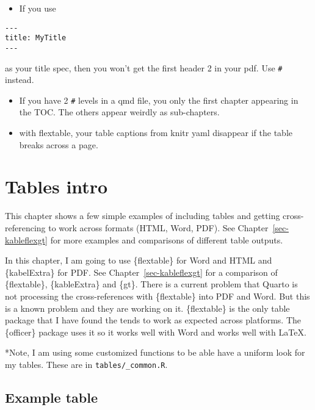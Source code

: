 \documentclass[
  letterpaper,
  oneside]{scrbook}
\providecommand{\tightlist}{%
  \setlength{\itemsep}{0pt}\setlength{\parskip}{0pt}}\usepackage{longtable,booktabs,array}
\begin{document}
\begin{itemize}
\tightlist
\item
  If you use
\end{itemize}

\begin{verbatim}
---
title: MyTitle
---
\end{verbatim}

as your title spec, then you won't get the first header 2 in your pdf.
Use \texttt{\#} instead.

\begin{itemize}
\item
  If you have 2 \texttt{\#} levels in a qmd file, you only the first
  chapter appearing in the TOC. The others appear weirdly as
  sub-chapters.
\item
  with flextable, your table captions from knitr yaml disappear if the
  table breaks across a page.
\end{itemize}


\hypertarget{tables-intro}{%
\chapter{Tables intro}\label{tables-intro}}

This chapter shows a few simple examples of including tables and getting
cross-referencing to work across formats (HTML, Word, PDF). See
Chapter~\ref{sec-kableflexgt} for more examples and comparisons of
different table outputs.

In this chapter, I am going to use \{flextable\} for Word and HTML and
\{kabelExtra\} for PDF. See Chapter~\ref{sec-kableflexgt} for a
comparison of \{flextable\}, \{kableExtra\} and \{gt\}. There is a
current problem that Quarto is not processing the cross-references with
\{flextable\} into PDF and Word. But this is a known problem and they
are working on it. \{flextable\} is the only table package that I have
found the tends to work as expected across platforms. The \{officer\}
package uses it so it works well with Word and works well with LaTeX.

*Note, I am using some customized functions to be able have a uniform
look for my tables. These are in \texttt{tables/\_common.R}.

\hypertarget{example-table}{%
\section{Example table}\label{example-table}}
\end{document}
